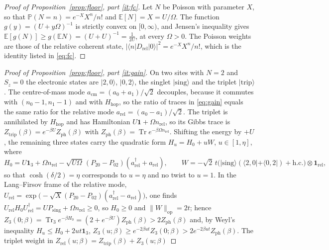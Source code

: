 \documentclass[11pt]{article}
\theoremstyle{plain}
\theoremstyle{definition}
\DeclareMathOperator{\Tr}{Tr}
\begin{document}
\begin{proof}[Proof of Proposition~\ref{prop:floor}, part \ref{it:fc}]
Let $N$ be Poisson with parameter $X$, so that $\mathbb{P}(N=n)=e^{-X}X^{n}/n!$ and
$\mathbb{E}[N]=X=U/\Omega$. The function $g(y)=(U+y\Omega)^{-1}$ is strictly
convex on $[0,\infty)$, and Jensen's inequality gives
$\mathbb{E}[g(N)]\ge g(\mathbb{E}N)=(U+U)^{-1}=\frac{1}{2U}$, at every
$\Omega>0$. The Poisson weights are those of the relative coherent state,
$\bigl|\langle n|D_{\mathrm{rel}}|0\rangle\bigr|^{2}=e^{-X}X^{n}/n!$, which is the
identity listed in \eqref{eq:fc}.
\end{proof}

\begin{proof}[Proof of Proposition~\ref{prop:floor}, part \ref{it:gain}]
On two sites with $N=2$ and $S_z=0$ the electronic states are
$|2,0\rangle$, $|0,2\rangle$, the singlet $|\mathrm{sing}\rangle$ and the triplet
$|\mathrm{trip}\rangle$. The centre-of-mass mode
$a_{\mathrm{cm}}=(a_0+a_1)/\sqrt2$ decouples, because it commutes with
$(n_0-1,n_1-1)$ and with $H_{\mathrm{hop}}$, so the ratio of traces in
\eqref{eq:gain} equals the same ratio for the relative mode
$a_{\mathrm{rel}}=(a_0-a_1)/\sqrt2$. The triplet is annihilated by
$H_{\mathrm{hop}}$ and has Hamiltonian $U\mathbf 1+\Omega n_{\mathrm{rel}}$, so
its Gibbs trace is $Z_{\mathrm{trip}}(\beta)=e^{-\beta U}Z_{\mathrm{ph}}(\beta)$
with $Z_{\mathrm{ph}}(\beta)=\Tr e^{-\beta\Omega n_{\mathrm{rel}}}$. Shifting the
energy by $+U$, the remaining three states carry the quadratic form
$H_u=H_0+uW$, $u\in[1,\eta]$, where
\begin{equation}\label{eq:H0W}
H_0=U\mathbf 1_3+\Omega n_{\mathrm{rel}}-\sqrt{U\Omega}\,(P_{20}-P_{02})(a_{\mathrm{rel}}^\dagger+a_{\mathrm{rel}}),
\qquad
W=-\sqrt2\,t\bigl(|\mathrm{sing}\rangle(\langle2,0|+\langle0,2|)+\mathrm{h.c.}\bigr)\otimes\mathbf 1_{\mathrm{rel}} ,
\end{equation}
so that $\cosh(\delta/2)=\eta$ corresponds to $u=\eta$ and no twist to $u=1$.
In the Lang--Firsov frame of the relative mode,
$U_{\mathrm{rel}}=\exp\bigl(-\sqrt X(P_{20}-P_{02})(a_{\mathrm{rel}}^\dagger-a_{\mathrm{rel}})\bigr)$,
one finds $U_{\mathrm{rel}}H_0U_{\mathrm{rel}}^\dagger=UP_{\mathrm{sing}}+\Omega n_{\mathrm{rel}}\ge0$,
so $H_0\ge0$ and $\|W\|_{\mathrm{op}}=2t$; hence
$Z_3(0;\beta)=\Tr_3e^{-\beta H_0}=(2+e^{-\beta U})Z_{\mathrm{ph}}(\beta)>2Z_{\mathrm{ph}}(\beta)$
and, by Weyl's inequality $H_u\le H_0+2ut\mathbf 1_3$,
$Z_3(u;\beta)\ge e^{-2\beta ut}Z_3(0;\beta)>2e^{-2\beta ut}Z_{\mathrm{ph}}(\beta)$.
The triplet weight in $Z_{\mathrm{rel}}(u;\beta)=Z_{\mathrm{trip}}(\beta)+Z_3(u;\beta)$

\end{proof}
\end{document}

